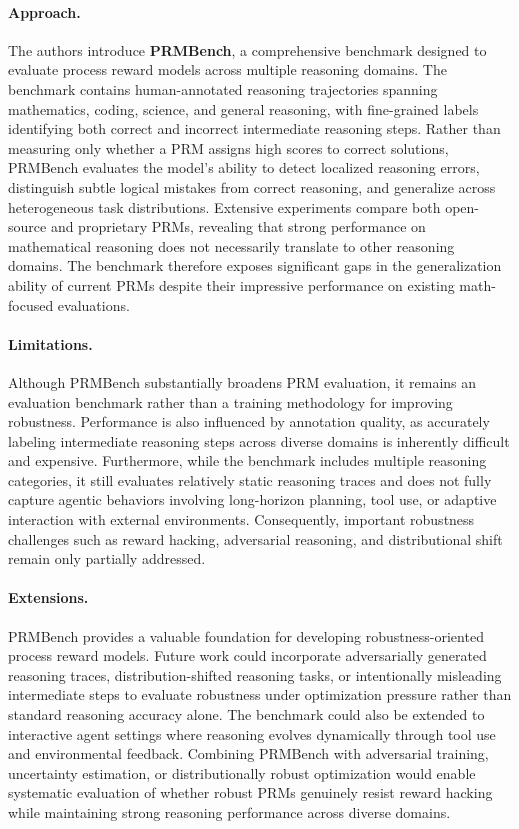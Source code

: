 \documentclass[11pt]{article}
\begin{document}
\paragraph{Approach.}
The authors introduce \textbf{PRMBench}, a comprehensive benchmark designed to evaluate process reward models across multiple reasoning domains. The benchmark contains human-annotated reasoning trajectories spanning mathematics, coding, science, and general reasoning, with fine-grained labels identifying both correct and incorrect intermediate reasoning steps. Rather than measuring only whether a PRM assigns high scores to correct solutions, PRMBench evaluates the model's ability to detect localized reasoning errors, distinguish subtle logical mistakes from correct reasoning, and generalize across heterogeneous task distributions. Extensive experiments compare both open-source and proprietary PRMs, revealing that strong performance on mathematical reasoning does not necessarily translate to other reasoning domains. The benchmark therefore exposes significant gaps in the generalization ability of current PRMs despite their impressive performance on existing math-focused evaluations.

\paragraph{Limitations.}
Although PRMBench substantially broadens PRM evaluation, it remains an evaluation benchmark rather than a training methodology for improving robustness. Performance is also influenced by annotation quality, as accurately labeling intermediate reasoning steps across diverse domains is inherently difficult and expensive. Furthermore, while the benchmark includes multiple reasoning categories, it still evaluates relatively static reasoning traces and does not fully capture agentic behaviors involving long-horizon planning, tool use, or adaptive interaction with external environments. Consequently, important robustness challenges such as reward hacking, adversarial reasoning, and distributional shift remain only partially addressed.

\paragraph{Extensions.}
PRMBench provides a valuable foundation for developing robustness-oriented process reward models. Future work could incorporate adversarially generated reasoning traces, distribution-shifted reasoning tasks, or intentionally misleading intermediate steps to evaluate robustness under optimization pressure rather than standard reasoning accuracy alone. The benchmark could also be extended to interactive agent settings where reasoning evolves dynamically through tool use and environmental feedback. Combining PRMBench with adversarial training, uncertainty estimation, or distributionally robust optimization would enable systematic evaluation of whether robust PRMs genuinely resist reward hacking while maintaining strong reasoning performance across diverse domains.
\end{document}

